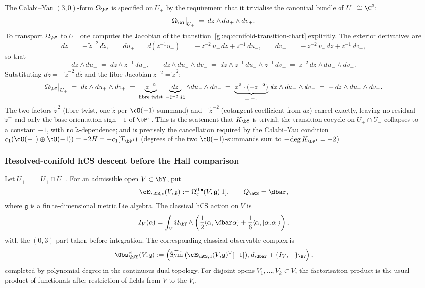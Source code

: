 The Calabi--Yau $(3,0)$-form $\Omega_{\bY}$ is specified on $U_+$ by the
requirement that it trivialise the canonical bundle of $U_+ \cong \C^3$:
\[
 \Omega_{\bY}\big|_{U_+} \;=\; dz \wedge du_+ \wedge dv_+.
\]
To transport $\Omega_{\bY}$ to $U_-$ one computes the Jacobian of the
transition~\eqref{gl:eq:conifold-transition-chart} explicitly. The exterior
derivatives are
\[
 dz \;=\; -\tilde z^{-2}\, d\tilde z,
 \qquad
 du_+ \;=\; d(z^{-1} u_-)
 \;=\; -z^{-2}\, u_-\, dz + z^{-1}\, du_-,
 \qquad
 dv_+ \;=\; -z^{-2}\, v_-\, dz + z^{-1}\, dv_-,
\]
so that
\[
 dz \wedge du_+ \;=\; dz \wedge z^{-1}\, du_-,
 \qquad
 dz \wedge du_+ \wedge dv_+ \;=\; dz \wedge z^{-1}\, du_- \wedge z^{-1}\, dv_-
 \;=\; z^{-2}\, dz \wedge du_- \wedge dv_-.
\]
Substituting $dz = -\tilde z^{-2}\, d\tilde z$ and the fibre Jacobian
$z^{-2} = \tilde z^{\,2}$:
\begin{equation}\label{eq:jacobian-calculation}
 \Omega_{\bY}\big|_{U_+}
 \;=\; dz \wedge du_+ \wedge dv_+
 \;=\; \underbrace{z^{-2}}_{\text{fibre twist}}\,
 \underbrace{dz}_{-\tilde z^{-2}\, d\tilde z}
 \wedge du_- \wedge dv_-
 \;=\; \underbrace{\tilde z^{\,2} \cdot (-\tilde z^{-2})}_{=\;-1}\,
 d\tilde z \wedge du_- \wedge dv_-
 \;=\; -\,d\tilde z \wedge du_- \wedge dv_-.
\end{equation}
The two factors $\tilde z^{\,2}$ (fibre twist, one $\tilde z$ per $\cO(-1)$
summand) and $-\tilde z^{-2}$ (cotangent coefficient from $dz$) cancel
exactly, leaving no residual $\tilde z^{\pm}$ and only the
base-orientation sign $-1$ of $\bP^1$. This is the statement that
$K_{\bY}$ is trivial; the transition cocycle on $U_+ \cap U_-$
collapses to a constant $-1$, with no $\tilde z$-dependence; and is
precisely the cancellation required by the Calabi--Yau condition
$c_1(\cO(-1) \oplus \cO(-1)) = -2H = -c_1(T_{\bP^1})$ (degrees of the
two $\cO(-1)$-summands sum to $-\deg K_{\bP^1} = -2$).

\subsubsection{Resolved-conifold hCS descent before the Hall comparison}

Let \(U_{+-}=U_+\cap U_-\).  For an admissible open
\(V\subset \bY\), put
\[
 \cE_{\hCS,c}(V,\mathfrak g)
 :=
 \Omega_c^{0,\bullet}(V,\mathfrak g)[1],
 \qquad
 Q_{\hCS}=\dbar ,
\]
where \(\mathfrak g\) is a finite-dimensional metric Lie algebra.  The
classical hCS action on \(V\) is
\[
 I_V(\alpha)
 =
 \int_V \Omega_{\bY}\wedge
 \left(
 \frac12\langle\alpha,\dbar\alpha\rangle
 +\frac16\langle\alpha,[\alpha,\alpha]\rangle
 \right),
\]
with the \((0,3)\)-part taken before integration.  The corresponding
classical observable complex is
\[
 \Obs_{\hCS}^{\mathrm{cl}}(V,\mathfrak g)
 :=
 \left(
 \widehat{\mathrm{Sym}}\,
   \bigl(\cE_{\hCS,c}(V,\mathfrak g)^\vee[-1]\bigr),
 d_{\dbar}+\{I_V,-\}_{\BV}
 \right),
\]
completed by polynomial degree in the continuous dual topology.  For
disjoint opens \(V_1,\ldots,V_k\subset V\), the factorisation product is
the usual product of functionals after restriction of fields from \(V\)
to the \(V_i\).

